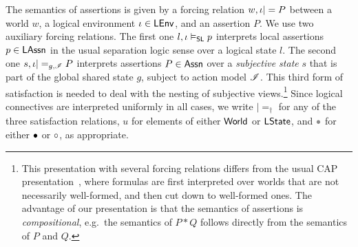 The semantics of \colosl assertions is given by a forcing relation
$w,\iota|= P$ between a world $w$, a logical environment
$\iota\in\mathsf{LEnv}$, and an assertion $P$. We use two auxiliary forcing
relations. The first one $l,\iota\mathrel{\vDash_{\mathsf{SL}}} p$ interprets local assertions
$p\in\mathsf{LAssn}$ in the usual separation logic sense over a logical
state $l$. The second one $s,\iota|=_{g,\mathscr{I}} P$ interprets
assertions $P\in\mathsf{Assn}$ over a \emph{subjective state} $s$ that
is part of the global shared state $g$, subject to action model
$\mathscr{I}$. This third form of satisfaction is needed to deal with the
nesting of subjective views.\footnote{This presentation with several
  forcing relations differs from the usual CAP
  presentation~\cite{cap-ecoop10}, where formulas are first
  interpreted over worlds that are not necessarily well-formed, and
  then cut down to well-formed ones. The advantage of our presentation
  is that the semantics of assertions is \emph{compositional},
  e.g.\ the semantics of $P * Q$ follows directly from the semantics
  of $P$ and $Q$.}  Since logical connectives are interpreted
uniformly in all cases, we write $|=_\dagger$ for any of the three
satisfaction relations, $u$ for elements of either $\mathsf{World}$ or
$\mathsf{LState}$, and $\grey$ for either $\bullet$ or $\circ$, as
appropriate.

